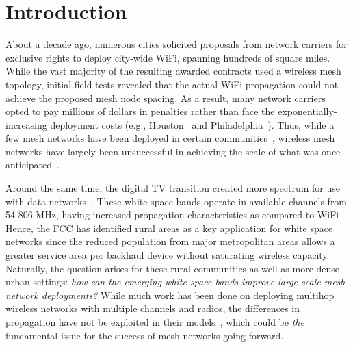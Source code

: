 \section{Introduction}
\label{sec:introduction}



About a decade ago, numerous cities solicited proposals from
network carriers for exclusive rights to deploy city-wide WiFi,
spanning hundreds of square miles.  
While the vast majority of the resulting awarded contracts used
a wireless mesh topology, initial field tests revealed that the 
actual WiFi propagation could not achieve the proposed mesh node
spacing. As a result, many network carriers opted to pay millions of 
dollars in penalties rather than face the exponentially-increasing
deployment costs (e.g., Houston~\cite{cnet_aug07} and 
Philadelphia~\cite{arstechnica_may08}). Thus, while a few mesh 
networks have been deployed in certain communities~\cite{CRSK06,google_imc08},
wireless mesh networks have largely been unsuccessful in achieving 
the scale of what was once anticipated~\cite{taps}.


Around the same time, the digital TV transition created more
spectrum for use with data networks~\cite{fccwhitespace}. These white 
space bands operate in available channels from 54-806 MHz, having
increased propagation characteristics as compared to 
WiFi~\cite{balanis2012antenna}. Hence, the FCC has identified rural
areas as a key application for white space networks since the reduced
population from major metropolitan areas allows a greater service area
per backhaul device without saturating wireless capacity. Naturally, 
the question arises for these rural communities as well as more dense 
urban settings: {\it how can the emerging white space bands improve 
large-scale mesh network deployments?}  While much work has been done 
on deploying multihop wireless networks with multiple channels and 
radios, the differences in propagation have not be exploited in their 
models~\cite{raniwala2004centralized,tang2005interference, si2010overview}, 
which could be {\it the} fundamental issue for the success of mesh 
networks going forward.

